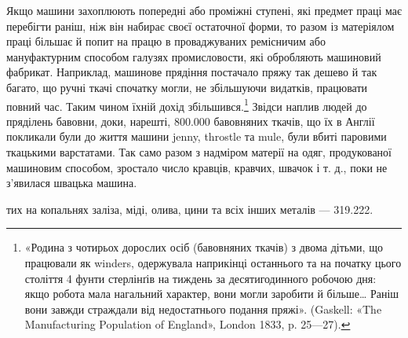 Якщо машини захоплюють попередні або проміжні ступені,
які предмет праці має перебігти раніш, ніж він набирає своєї
остаточної форми, то разом із матеріялом праці більшає й попит
на працю в проваджуваних ремісничим або мануфактурним способом
галузях промисловости, які обробляють машиновий
фабрикат. Наприклад, машинове прядіння постачало пряжу так
дешево й так багато, що ручні ткачі спочатку могли, не збільшуючи
видатків, працювати повний час. Таким чином їхній дохід
збільшився.\footnote{
«Родина з чотирьох дорослих осіб (бавовняних ткачів) з двома
дітьми, що працювали як winders, одержувала наприкінці останнього та
на початку цього століття 4 фунти стерлінґів на тиждень за десятигодинного
робочою дня: якщо робота мала нагальний характер, вони могли
заробити й більше\dots{} Раніш вони завжди страждали від недостатнього
подання пряжі». (Gaskell: «The Manufacturing Population of England»,
London 1833, p. 25—27).
} Звідси наплив людей до пряділень бавовни,
доки, нарешті, 800.000 бавовняних ткачів, що їх в Англії покликали
були до життя машини jenny, throstle та mule, були
вбиті паровими ткацькими варстатами. Так само разом з надміром
матерії на одяг, продукованої машиновим способом, зростало
число кравців, кравчих, швачок і т. д., поки не з’явилася
швацька машина.

тих на копальнях заліза, міді, олива, цини та всіх інших металів —
319.222.
